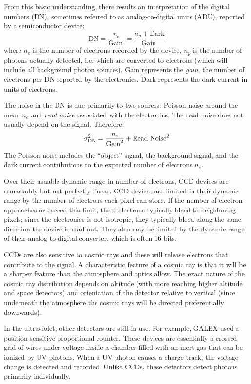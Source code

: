 From this basic understanding, there results an interpretation of the
digital numbers (DN), sometimes referred to as analog-to-digital
units (ADU), reported by a semiconductor device:
\begin{equation}
\mathrm{DN} =
\frac{n_e}{\mathrm{Gain~}} = 
\frac{n_p + \mathrm{Dark}}
{\mathrm{Gain~}}
\end{equation}
where $n_e$ is the number of electrons recorded by the device, $n_p$
is the number of photons actually detected, i.e. which are converted
to electrons (which will include all background photon sources). Gain
represents the {\it gain}, the number of electrons per DN reported by
the electronics. Dark represents the dark current in units of
electrons.

The noise in the DN is due primarily to two sources: Poisson noise
around the mean $n_e$ and {\it read noise} associated with the
electronics. The read noise does not usually depend on the
signal. Therefore:
\begin{equation}
\sigma_{\rm DN}^2 = \frac{n_e}{\mathrm{Gain}^2} + \mathrm{Read~Noise}^2
\end{equation}
The Poisson noise includes the ``object'' signal, the background
signal, and the dark current contributions to the expected number of
electrons $n_e$.

Over their usuable dynamic range in number of electrons, CCD devices
are remarkably but not perfectly linear.  CCD devices are limited in
their dynamic range by the number of electrons each pixel can
store. If the number of electron approaches or exceed this limit,
those electrons typically bleed to neighboring pixels; since the
electronics is not isotropic, they typically bleed along the same
direction the device is read out. They also may be limited by the
dynamic range of their analog-to-digital converter, which is often
16-bits.

CCDs are also sensitive to cosmic rays and these will release
electrons that contribute to the signal. A characteristic feature of a
cosmic ray is that it will be a sharper feature than the atmosphere
and optics allow. The exact nature of the cosmic ray distribution
depends on altitude (with more reaching higher altitude and space
detectors) and orientation of the detector relative to vertical (since
underneath the atmosphere the cosmic rays will be directed
preferentially downwards).

In the ultraviolet, other detectors are still in use. For example,
GALEX used a position sensitive proportional counter. These devices
are essentially a crossed grid of wires under voltage inside a chamber
filled with an inert gas that can be ionized by UV photons. When a UV
photon causes a charge track, the voltage change is detected and
recorded. Unlike CCDs, these detectors detect photons primarily
individually.

